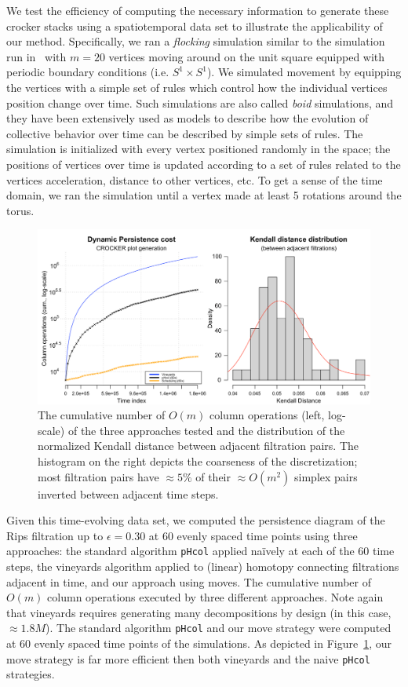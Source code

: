 \documentclass{siamart190516}
\begin{document}
We test the efficiency of computing the necessary information to generate these crocker stacks using a spatiotemporal data set to illustrate the applicability of our method. Specifically, we ran a \emph{flocking} simulation similar to the simulation run in~\cite{topaz2015topological} with $m = 20$ vertices moving around on the unit square equipped with periodic boundary conditions (i.e. $S^1 \times S^1$). We simulated movement by equipping the vertices with a simple set of rules which control how the individual vertices position change over time. Such simulations are also called \emph{boid} simulations, and they have been extensively used as models to describe how the evolution of collective behavior over time can be described by simple sets of rules.
The simulation is initialized with every vertex positioned randomly in the space; the positions of vertices over time is updated according to a set of rules related to the vertices acceleration, distance to other vertices, etc. To get a sense of the time domain, we ran the simulation until a vertex made at least 5 rotations around the torus. 
\begin{figure}[ht]
	\centering
	\includegraphics[width=\textwidth]{boid_sim_results.png}
	\caption{ The cumulative number of $O(m)$ column operations (left, log-scale) of the three approaches tested and the distribution of the normalized Kendall distance between adjacent filtration pairs. The histogram on the right depicts the coarseness of the discretization; most filtration pairs have $\approx 5\%$ of their $\approx O(m^2)$ simplex pairs inverted between adjacent time steps.}\label{fig:boid_sim_results}
\end{figure}

Given this time-evolving data set, we computed the persistence diagram of the Rips filtration up to $\epsilon = 0.30$ at 60 evenly spaced time points using three approaches: the standard algorithm \texttt{pHcol} applied naïvely at each of the 60 time steps, the vineyards algorithm applied to (linear) homotopy connecting filtrations adjacent in time, and our approach using moves.   
The cumulative number of $O(m)$ column operations executed by three different approaches. Note again that vineyards requires generating many decompositions by design (in this case, $\approx 1.8M$). The standard algorithm \texttt{pHcol} and our move strategy were computed at 60 evenly spaced time points of the simulations. As depicted in Figure~\ref{fig:boid_sim_results}, our move strategy is far more efficient then both vineyards and the naive \texttt{pHcol} strategies. 
\end{document}
